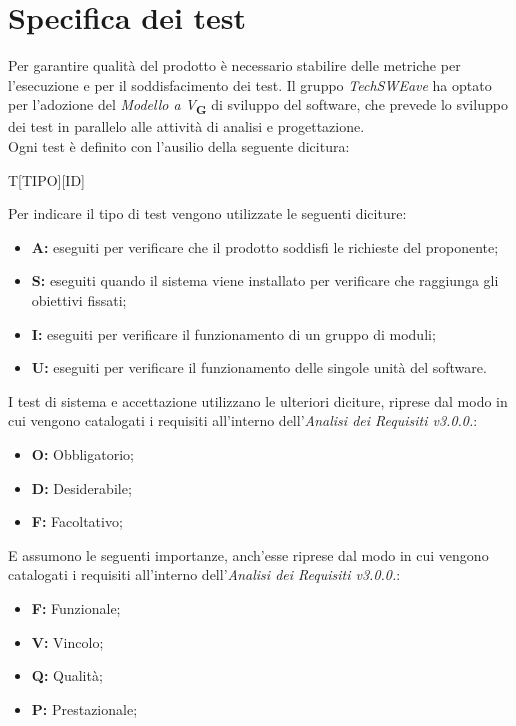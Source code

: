\section{Specifica dei test}
Per garantire qualità del prodotto è necessario stabilire delle metriche per l’esecuzione e per il soddisfacimento dei test.
Il gruppo \textit{TechSWEave} ha optato per l'adozione del \textit{Modello a V}\textsubscript{\textbf{G}} di sviluppo del software, che
prevede lo sviluppo dei test in parallelo alle attività di analisi e progettazione.\\
Ogni test è definito con l'ausilio della seguente dicitura:\\
\begin{center}
    T[TIPO][ID]
\end{center}
Per indicare il tipo di test vengono utilizzate le seguenti diciture:
\begin{itemize}
    \item \textbf{A:} eseguiti per verificare che il prodotto soddisfi le richieste del proponente;
    \item \textbf{S:} eseguiti quando il sistema viene installato per verificare che raggiunga gli obiettivi fissati;
    \item \textbf{I:} eseguiti per verificare il funzionamento di un gruppo di moduli;
    \item \textbf{U:} eseguiti per verificare il funzionamento delle singole unità del software.
\end{itemize}
I test di sistema e accettazione utilizzano le ulteriori diciture, riprese dal modo in cui vengono catalogati i requisiti all'interno dell'\textit{Analisi dei Requisiti v3.0.0.}:
\begin{itemize}
    \item \textbf{O:} Obbligatorio;
    \item \textbf{D:} Desiderabile;
    \item \textbf{F:} Facoltativo;
\end{itemize}
E assumono le seguenti importanze, anch'esse riprese dal modo in cui vengono catalogati i requisiti all'interno dell'\textit{Analisi dei Requisiti v3.0.0.}:
\begin{itemize}
    \item \textbf{F:} Funzionale;
    \item \textbf{V:} Vincolo;
    \item \textbf{Q:} Qualità;
    \item \textbf{P:} Prestazionale;
\end{itemize}
